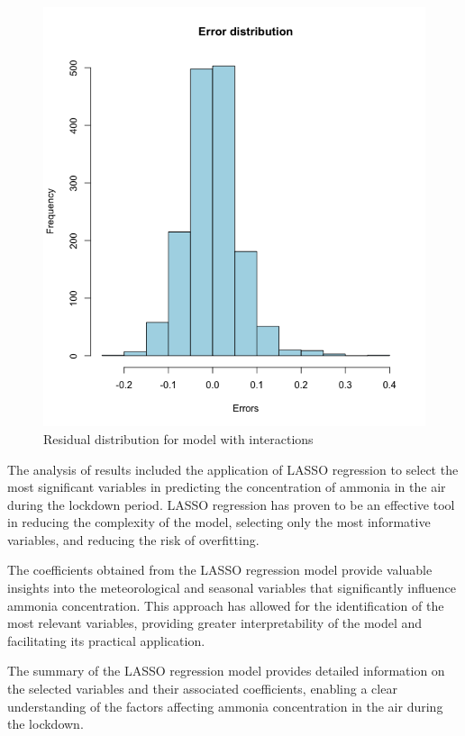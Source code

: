 \documentclass[10pt]{article} %
\begin{document}
    \begin{figure}[h]
            \centering
            \includegraphics[scale=0.45]{Assets/Interaction_result2.png}
            \caption{Residual distribution for model with interactions}
            \label{fig:enter-label}
        \end{figure}
    
    The analysis of results included the application of LASSO regression to select the most significant variables in predicting the concentration of ammonia in the air during the lockdown period. LASSO regression has proven to be an effective tool in reducing the complexity of the model, selecting only the most informative variables, and reducing the risk of overfitting.
    
    The coefficients obtained from the LASSO regression model provide valuable insights into the meteorological and seasonal variables that significantly influence ammonia concentration. This approach has allowed for the identification of the most relevant variables, providing greater interpretability of the model and facilitating its practical application.
    
    The summary of the LASSO regression model provides detailed information on the selected variables and their associated coefficients, enabling a clear understanding of the factors affecting ammonia concentration in the air during the lockdown.
    
\end{document}
